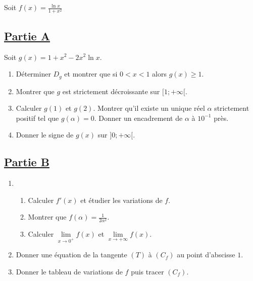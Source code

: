 \documentclass[12pt,a4paper]{article}
\begin{document}
    \section*{}
    Soit \( f(x) = \frac{\ln x}{1 + x^2} \)

    \subsection*{\underline{\textbf{Partie A}}}

    Soit \( g(x) = 1 + x^2 - 2x^2 \ln x. \)

    \begin{enumerate}
        \item Déterminer \( D_g \) et montrer que si \( 0 < x < 1 \) alors \( g(x) \geq 1 \).
        \item Montrer que \( g \) est strictement décroissante sur \( [1; +\infty[ \).
        \item Calculer \( g(1) \) et \( g(2) \). Montrer qu’il existe un unique réel \( \alpha \) strictement positif tel que \( g(\alpha) = 0 \). Donner un encadrement de \( \alpha \) à \( 10^{-1} \) près.
        \item Donner le signe de \( g(x) \) sur \( ]0; +\infty[ \).
    \end{enumerate}

    \subsection*{\underline{\textbf{Partie B}}}

    \begin{enumerate}
        \item
              \begin{enumerate}
                  \item Calculer \( f'(x) \) et étudier les variations de \( f \).
                  \item Montrer que \( f(\alpha) = \frac{1}{2\alpha^2} \).
                  \item Calculer \( \lim\limits_{x \to 0^+} f(x) \) et \( \lim\limits_{x \to +\infty} f(x) \).
              \end{enumerate}
        \item Donner une équation de la tangente \( (T) \) à \( (C_f) \) au point d’abscisse \( 1 \).
        \item Donner le tableau de variations de \( f \) puis tracer \( (C_f) \).
    \end{enumerate}
\end{document}
